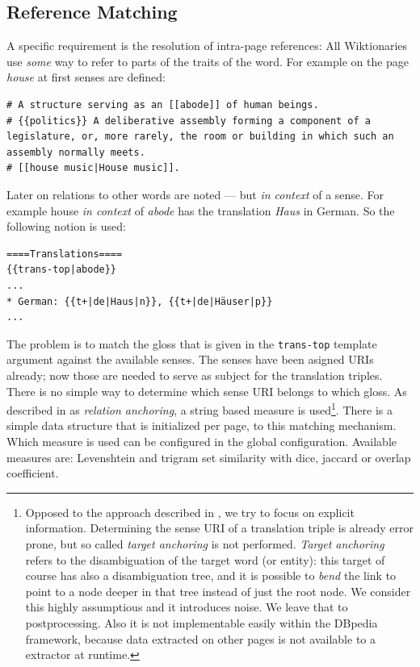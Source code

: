 \subsection{Reference Matching}\label{sec:matching}
A \wik specific requirement is the resolution of intra-page references: All Wiktionaries use \textit{some} way to refer to parts of the traits of the word. 
For example on the page \textit{house} at first senses are defined:
\begin{lstlisting}[style=wikitext]
# A structure serving as an [[abode]] of human beings.
# {{politics}} A deliberative assembly forming a component of a legislature, or, more rarely, the room or building in which such an assembly normally meets.
# [[house music|House music]].
\end{lstlisting}
Later on relations to other words are noted --- but \textit{in context} of a sense. 
For example house \textit{in context} of \textit{abode} has the translation \textit{Haus} in German. So the following notion is used:
\begin{lstlisting}[style=wikitext]
====Translations====
{{trans-top|abode}}
...
* German: {{t+|de|Haus|n}}, {{t+|de|Häuser|p}}
...
\end{lstlisting}
The problem is to match the gloss that is given in the \texttt{trans-top} template argument against the available senses.
The senses have been asigned URIs already; now those are needed to serve as subject for the translation triples. There is no simple way to determine which sense URI belongs to which gloss. 
As described in \cite{meyer_2011b} as \textit{relation anchoring}, a string based measure is used\footnote{Opposed to the approach described in \cite{meyer_2011b}, we try to focus on explicit information. Determining the sense URI of a translation triple is already error prone, but so called \textit{target anchoring} is not performed. 
\textit{Target anchoring} refers to the disambiguation of the target word (or entity): this target of course has also a disambiguation tree, and it is possible to \textit{bend} the link to point to a node deeper in that tree instead of just the root node. 
We consider this highly assumptious and it introduces noise. 
We leave that to postprocessing. 
Also it is not implementable easily within the DBpedia framework, because data extracted on other pages is not available to a extractor at runtime.}. 
There is a simple data structure that is initialized per page, to this matching mechanism. Which measure is used can be configured in the global configuration. 
Available measures are: Levenshtein and trigram set similarity with dice, jaccard or overlap coefficient. 
